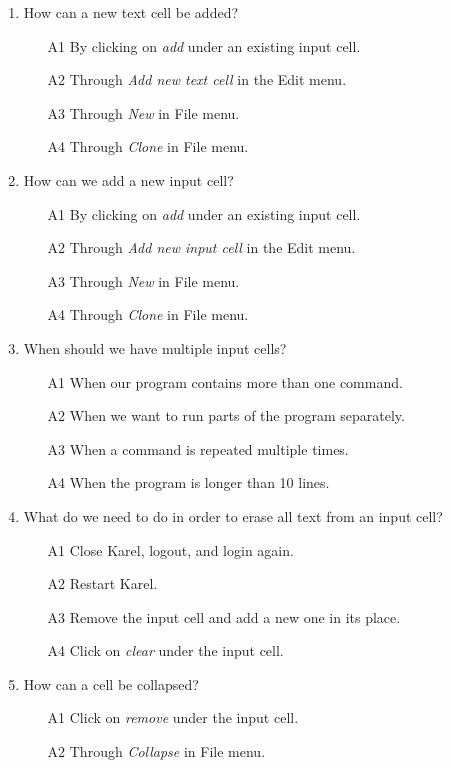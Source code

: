 \documentclass[article,A4,12pt]{llncs}
\begin{document}
{{{{\begin{enumerate}
\item How can a new text cell be added?
\begin{enumerate}
\item[A1] By clicking on {\em add} under an existing input cell.
\item[A2] Through {\em Add new text cell} in the Edit menu.
\item[A3] Through {\em New} in File menu.
\item[A4] Through {\em Clone} in File menu.
\end{enumerate}
\item How can we add a new input cell?
\begin{enumerate}
\item[A1] By clicking on {\em add} under an existing input cell.
\item[A2] Through {\em Add new input cell} in the Edit menu.
\item[A3] Through {\em New} in File menu.
\item[A4] Through {\em Clone} in File menu.
\end{enumerate}
\item When should we have multiple input cells?
\begin{enumerate}
\item[A1] When our program contains more than one command.
\item[A2] When we want to run parts of the program separately.
\item[A3] When a command is repeated multiple times.
\item[A4] When the program is longer than 10 lines.
\end{enumerate}
\item What do we need to do in order to erase all text from an input cell?
\begin{enumerate}
\item[A1] Close Karel, logout, and login again. 
\item[A2] Restart Karel.
\item[A3] Remove the input cell and add a new one in its place.
\item[A4] Click on {\em clear} under the input cell.
\end{enumerate}
\item How can a cell be collapsed?
\begin{enumerate}
\item[A1] Click on {\em remove} under the input cell.
\item[A2] Through {\em Collapse} in File menu.

\end{enumerate}
\end{enumerate}}}}}
\end{document}
